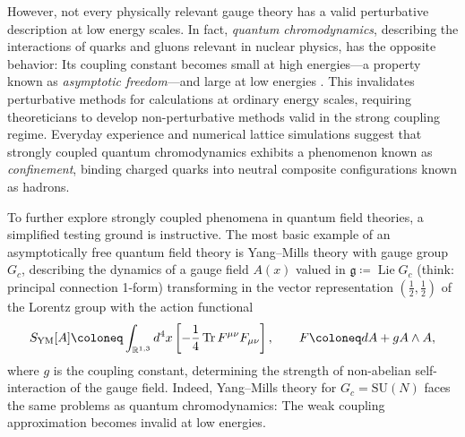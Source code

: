 However, not every physically relevant gauge theory has a valid perturbative description at low energy scales. In fact, \emph{quantum chromodynamics}, describing the interactions of quarks and gluons relevant in nuclear physics, has the opposite behavior: Its coupling constant becomes small at high energies---a property known as \emph{asymptotic freedom}---and large at low energies \cite{gross_ultraviolet_1973}. This invalidates perturbative methods for calculations at ordinary energy scales, requiring theoreticians to develop non-perturbative methods valid in the strong coupling regime. Everyday experience and numerical lattice simulations suggest that strongly coupled quantum chromodynamics exhibits a phenomenon known as \emph{confinement}, binding charged quarks into neutral composite configurations known as hadrons.

To further explore strongly coupled phenomena in quantum field theories, a simplified testing ground is instructive. The most basic example of an asymptotically free quantum field theory is Yang--Mills theory \cite{yang_conservation_1954} with gauge group $G_c$, describing the dynamics of a gauge field $A(x)$ valued in $\mathfrak{g} \coloneq \operatorname{Lie} G_c$ (think: principal connection 1-form) transforming in the vector representation $(\tfrac 12, \tfrac 12)$ of the Lorentz group with the action functional
\begin{equation}
	S_\text{YM}[A] \coloneq \int_{\R^{1,3}} d^4 x \left[ {-\frac{1}{4}} \Tr F^{\mu\nu} F_{\mu\nu} \right], \qquad F \coloneq dA + g A \wedge A,
\end{equation}
where $g$ is the coupling constant, determining the strength of non-abelian self-interaction of the gauge field. Indeed, Yang--Mills theory for $G_c = \mathrm{SU}(N)$ faces the same problems as quantum chromodynamics: The weak coupling approximation becomes invalid at low energies.

